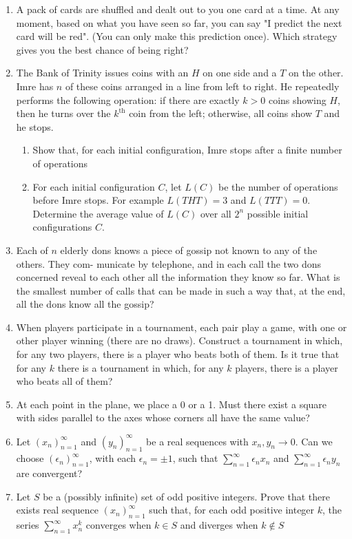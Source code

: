 \documentclass[12pt,a4paper]{article}
\newcommand\seq[1]{(#1 _{n})_{n=1}^{\infty}}
\begin{document}
\begin{enumerate}
		\item A pack of cards are shuffled and dealt out to you one card at a time. At any moment, based on what you have seen so far, you can say "I predict the next card will be red". (You can only make this prediction once). Which strategy gives you the best chance of being right?
		\item The Bank of Trinity issues coins with an $H$ on one side and a $T$ on the other. Imre has $n$ of these coins arranged in a line from left to right. He repeatedly performs the following operation: if there are exactly $k > 0$ coins showing $H$, then he turns over the $k^{\text{th}}$ coin from the left; otherwise, all coins show $T$ and he stops.
		\begin{enumerate}
			\item Show that, for each initial configuration, Imre stops after a finite number of operations
			\item For each initial configuration $C$, let $L(C)$ be the number of operations before Imre stops. For example $L(THT) = 3$ and $L(TTT)=0$. Determine the average value of $L(C)$ over all $2^{n}$ possible initial configurations $C$.
		\end{enumerate}
		\item Each of $n$ elderly dons knows a piece of gossip not known to any of the others. They com- municate by telephone, and in each call the two dons concerned reveal to each other all the information they know so far. What is the smallest number of calls that can be made in such a way that, at the end, all the dons know all the gossip?
		\item When players participate in a tournament, each pair play a game, with one or other player winning (there are no draws). Construct a tournament in which, for any two players, there is a player who beats both of them. Is it true that for any $k$ there is a tournament in which, for any $k$ players, there is a player who beats all of them?
		\item At each point in the plane, we place a 0 or a 1. Must there exist a square with sides parallel to the axes whose corners all have the same value?
		\item Let $\seq{x}$ and $\seq{y}$ be a real sequences with $x_{n}, y_{n} \to 0$. Can we choose $\seq{\epsilon}$, with each $\epsilon_{n} = \pm 1$, such that $\sum_{n=1}^{\infty} \epsilon_{n} x_{n}$ and $\sum_{n=1}^{\infty} \epsilon_{n} y_{n}$ are convergent?
		\item Let $S$ be a (possibly infinite) set of odd positive integers. Prove that there exists real sequence $\seq{x}$ such that, for each odd positive integer $k$, the series $\sum_{n=1}^{\infty} x_{n}^{k}$ converges when $k \in S$ and diverges when $k \not\in S$

\end{enumerate}
\end{document}
